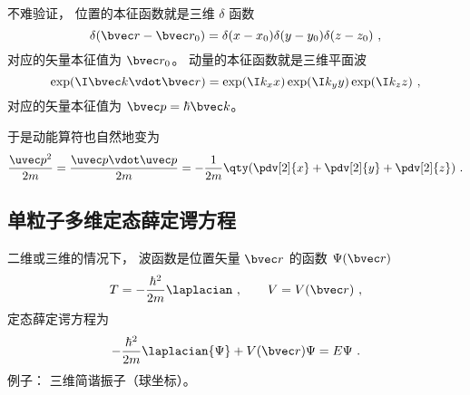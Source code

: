 不难验证， 位置的本征函数就是三维 $\delta$ 函数
\begin{equation}
\delta(\bvec r - \bvec r_0) = \delta(x - x_0) \delta(y - y_0) \delta(z - z_0)~,
\end{equation}
对应的矢量本征值为 $\bvec r_0$。 动量的本征函数就是三维平面波
\begin{equation}
\exp(\I \bvec k \vdot \bvec r) = \exp(\I k_x x) \exp(\I k_y y) \exp(\I k_z z)~,
\end{equation}
对应的矢量本征值为 $\bvec p = \hbar\bvec k$。

于是动能算符也自然地变为
\begin{equation}
\frac{\uvec p^2}{2m} = \frac{\uvec p \vdot \uvec p}{2m} = -\frac{1}{2m} \qty(\pdv[2]{x} + \pdv[2]{y} + \pdv[2]{z})~.
\end{equation}

\subsection{单粒子多维定态薛定谔方程}
二维或三维的情况下， 波函数是位置矢量 $\bvec r$ 的函数 $\Psi(\bvec r)$
\begin{equation}
T = -\frac{\hbar^2}{2m} \laplacian ~,\qquad V = V(\bvec r)~,
\end{equation}
定态薛定谔方程为
\begin{equation}\label{eq_QMndim_4}
-\frac{\hbar^2}{2m} \laplacian {\Psi} + V(\bvec r)\Psi = E \Psi~.
\end{equation}
例子： 三维简谐振子（球坐标）。
